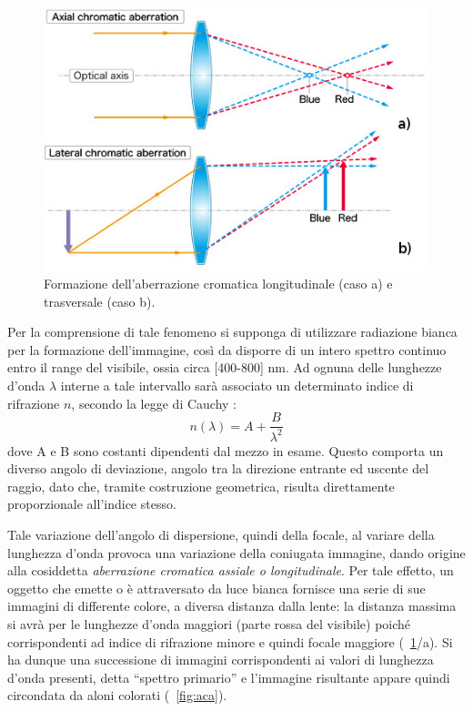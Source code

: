 \begin{figure}
 \centering
 \includegraphics[scale=.60]{img/CAP2ac.jpg}
 \caption{\small{Formazione dell'aberrazione cromatica longitudinale (caso a) e trasversale (caso b).}}
 \label{fig:ac}
\end{figure}

Per la comprensione di tale fenomeno si supponga di utilizzare radiazione bianca per la formazione dell'immagine, così da disporre di un intero spettro continuo entro il range del visibile, ossia circa [400-800] nm. Ad ognuna delle lunghezze d'onda $\lambda$ interne a tale intervallo sarà associato un determinato indice di rifrazione $n$, secondo la legge di Cauchy \cite{nigro}:
$$n(\lambda) = A + \frac{B}{\lambda ^2}$$
dove A e B sono costanti dipendenti dal mezzo in esame.
Questo comporta un diverso angolo di deviazione, angolo tra la direzione entrante ed uscente del raggio, dato che, tramite costruzione geometrica, risulta direttamente proporzionale all'indice stesso.

Tale variazione dell'angolo di dispersione, quindi della focale, al variare della lunghezza d'onda provoca una variazione della coniugata immagine, dando origine alla cosiddetta \textit{aberrazione cromatica assiale o longitudinale}. 
Per tale effetto, un oggetto che emette o è attraversato da luce bianca fornisce una serie di sue immagini di differente colore, a diversa distanza dalla lente: la distanza massima si avrà per le lunghezze d'onda maggiori (parte rossa del visibile) poiché corrispondenti ad indice di rifrazione minore e quindi focale maggiore (\figurename~\ref{fig:ac}/a). 
Si ha dunque una successione di immagini corrispondenti ai valori di lunghezza d'onda presenti, detta ``spettro primario'' e l'immagine risultante appare quindi circondata da aloni colorati (\figurename~\ref{fig:aca}).

